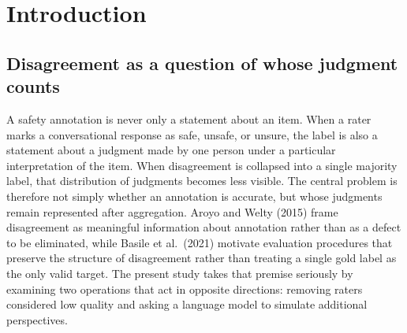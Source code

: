 \documentclass[11pt,a4paper]{article}
\newif\ifshortversion
\begin{document}
%
%
\ifshortversion\else
\vspace{1em}
\tableofcontents
\newpage
\fi

\section{Introduction}

\subsection{Disagreement as a question of whose judgment counts}

A safety annotation is never only a statement about an item. When a rater marks a conversational
response as safe, unsafe, or unsure, the label is also a statement about a judgment made by one
person under a particular interpretation of the item. When disagreement is collapsed into a
single majority label, that distribution of judgments becomes less visible. The central problem
is therefore not simply whether an annotation is accurate, but whose judgments remain represented
after aggregation. Aroyo and Welty (2015) frame disagreement as meaningful information about
annotation rather than as a defect to be eliminated, while Basile et al.\ (2021) motivate
evaluation procedures that preserve the structure of disagreement rather than treating a single
gold label as the only valid target. The present study takes that premise seriously by examining
two operations that act in opposite directions: removing raters considered low quality and asking
a language model to simulate additional perspectives.
\end{document}
